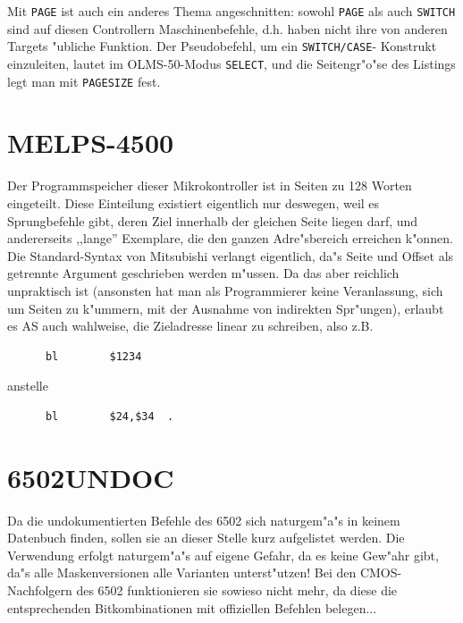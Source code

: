 \documentclass[12pt,a4paper,twoside]{report}
\newcommand{\tty}[1]{{\tt #1}}
\newcommand{\asname}{AS}
\begin{document}
Mit \tty{PAGE} ist auch ein anderes Thema angeschnitten: sowohl
\tty{PAGE} als auch \tty{SWITCH} sind auf diesen Controllern
Maschinenbefehle, d.h. haben nicht ihre von anderen Targets
"ubliche Funktion.  Der Pseudobefehl, um ein \tty{SWITCH/CASE}-
Konstrukt einzuleiten, lautet im OLMS-50-Modus \tty{SELECT}, und
die Seitengr"o"se des Listings legt man mit \tty{PAGESIZE} fest.


\section{MELPS-4500}

Der Programmspeicher dieser Mikrokontroller ist in Seiten zu
128 Worten eingeteilt.  Diese Einteilung existiert eigentlich nur
deswegen, weil es Sprungbefehle gibt, deren Ziel innerhalb der
gleichen Seite liegen darf, und andererseits ,,lange'' Exemplare,
die den ganzen Adre"sbereich erreichen k"onnen.  Die Standard-Syntax
von Mitsubishi verlangt eigentlich, da"s Seite und Offset als getrennte
Argument geschrieben werden m"ussen.  Da das aber reichlich unpraktisch
ist (ansonsten hat man als Programmierer keine Veranlassung, sich um
Seiten zu k"ummern, mit der Ausnahme von indirekten Spr"ungen), erlaubt
es \asname{} auch wahlweise, die Zieladresse linear zu schreiben, also z.B.
\begin{verbatim}
      bl        $1234
\end{verbatim}
anstelle
\begin{verbatim}
      bl        $24,$34  .
\end{verbatim}


\section{6502UNDOC}

Da die undokumentierten Befehle des 6502 sich naturgem"a"s in keinem
Datenbuch finden, sollen sie an dieser Stelle kurz aufgelistet werden.
Die Verwendung erfolgt naturgem"a"s auf eigene Gefahr, da es keine
Gew"ahr gibt, da"s alle Maskenversionen alle Varianten unterst"utzen!
Bei den CMOS-Nachfolgern des 6502 funktionieren sie sowieso nicht
mehr, da diese die entsprechenden Bitkombinationen mit offiziellen Befehlen
belegen...

\clearpage
\end{document}
